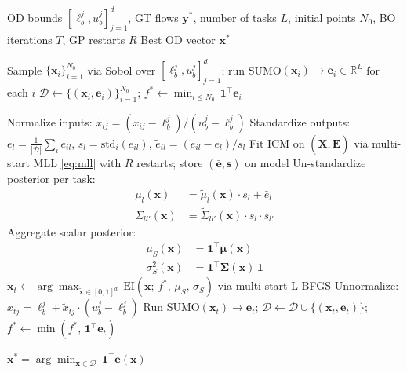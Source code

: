 \documentclass[11pt]{article}
\begin{document}
\begin{algorithm}[H]
\caption{ICM-BO for OD Calibration}
\label{alg:icm_bo}
\begin{algorithmic}[1]
\Require OD bounds $[\ell_b^j, u_b^j]_{j=1}^d$, GT flows $\mathbf{y}^*$,
         number of tasks $L$, initial points $N_0$,
         BO iterations $T$, GP restarts $R$
\Ensure  Best OD vector $\mathbf{x}^*$

\State Sample $\{\mathbf{x}_i\}_{i=1}^{N_0}$ via Sobol over $[\ell_b^j, u_b^j]_{j=1}^d$;
       run SUMO$(\mathbf{x}_i) \to \mathbf{e}_i \in \mathbb{R}^L$ for each $i$
\State $\mathcal{D} \leftarrow \{(\mathbf{x}_i, \mathbf{e}_i)\}_{i=1}^{N_0}$;\quad
       $f^* \leftarrow \min_{i \leq N_0}\, \mathbf{1}^\top \mathbf{e}_i$

    \State Normalize inputs: $\tilde{x}_{ij} = (x_{ij} - \ell_b^j)/(u_b^j - \ell_b^j)$
    \State Standardize outputs: $\bar{e}_l = \frac{1}{|\mathcal{D}|}\sum_i e_{il}$,\quad
           $s_l = \mathrm{std}_i(e_{il})$,\quad
           $\tilde{e}_{il} = (e_{il} - \bar{e}_l)/s_l$
    \State Fit ICM on $(\tilde{\mathbf{X}}, \tilde{\mathbf{E}})$ via multi-start MLL
           \eqref{eq:mll} with $R$ restarts; store $(\bar{\mathbf{e}}, \mathbf{s})$ on model
    \State Un-standardize posterior per task:
        \begin{align*}
            \mu_l(\mathbf{x}) &= \tilde{\mu}_l(\mathbf{x}) \cdot s_l + \bar{e}_l \\
            \Sigma_{ll'}(\mathbf{x}) &= \tilde{\Sigma}_{ll'}(\mathbf{x}) \cdot s_l \cdot s_{l'}
        \end{align*}
    \State Aggregate scalar posterior:
        \begin{align*}
            \mu_S(\mathbf{x}) &= \mathbf{1}^\top \boldsymbol{\mu}(\mathbf{x}) \\
            \sigma^2_S(\mathbf{x}) &= \mathbf{1}^\top \boldsymbol{\Sigma}(\mathbf{x})\, \mathbf{1}
        \end{align*}
    \State $\tilde{\mathbf{x}}_t \leftarrow \arg\max_{\tilde{\mathbf{x}} \in [0,1]^d}\,
           \mathrm{EI}(\tilde{\mathbf{x}};\, f^*,\, \mu_S,\, \sigma_S)$
           via multi-start L-BFGS
    \State Unnormalize: $x_{tj} = \ell_b^j + \tilde{x}_{tj} \cdot (u_b^j - \ell_b^j)$
    \State Run SUMO$(\mathbf{x}_t) \to \mathbf{e}_t$;\quad
           $\mathcal{D} \leftarrow \mathcal{D} \cup \{(\mathbf{x}_t, \mathbf{e}_t)\}$;\quad
           $f^* \leftarrow \min\!\left(f^*,\, \mathbf{1}^\top \mathbf{e}_t\right)$
\EndFor

\State \Return $\mathbf{x}^* = \arg\min_{\mathbf{x} \in \mathcal{D}}\, \mathbf{1}^\top \mathbf{e}(\mathbf{x})$
\end{algorithmic}
\end{algorithm}
\end{document}
